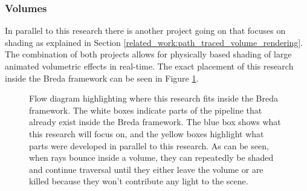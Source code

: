 \subsubsection{Volumes} \label{introduction:traverse_research:volumes}
In parallel to this research there is another project going on that focuses on shading as explained in Section \ref{related_work:path_traced_volume_rendering}. The combination of both projects allows for physically based shading of large animated volumetric effects in real-time. The exact placement of this research inside the Breda framework can be seen in Figure \ref{fig:project_structure}.

\begin{figure}[H]
    \centering
    \caption{Flow diagram highlighting where this research fits inside the Breda framework. The white boxes indicate parts of the pipeline that already exist inside the Breda framework. The blue box shows what this research will focus on, and the yellow boxes highlight what parts were developed in parallel to this research. As can be seen, when rays bounce inside a volume, they can repeatedly be shaded and continue traversal until they either leave the volume or are killed because they won't contribute any light to the scene.}
    \label{fig:project_structure}
\end{figure}